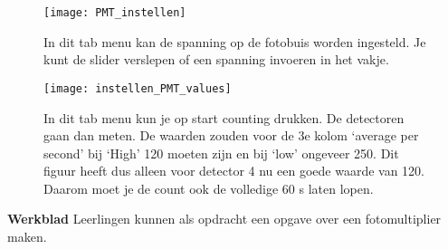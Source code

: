 \begin{figure}
    \centering
    \texttt{[image: PMT\_instellen]}
    \caption{In dit tab menu kan de spanning op de fotobuis worden ingesteld. 
    Je kunt de slider verslepen of een spanning invoeren in het vakje.}
    \label{fig:PMT_instellen}
\end{figure}

\begin{figure}
    \centering
    \texttt{[image: instellen\_PMT\_values]}
    \caption{In dit tab menu kun je op start counting drukken. De detectoren gaan dan meten.
    De waarden zouden voor de 3e kolom `average per second' bij `High' 120 moeten zijn en bij `low' ongeveer 250.
    Dit figuur heeft dus alleen voor detector 4 nu een goede waarde van 120. 
    Daarom moet je de count ook de volledige 60 s laten lopen.}    
    \label{fig:instellen_PMT_values}

\end{figure}
\textbf{Werkblad} 
Leerlingen kunnen als opdracht een opgave over een fotomultiplier maken.



  





